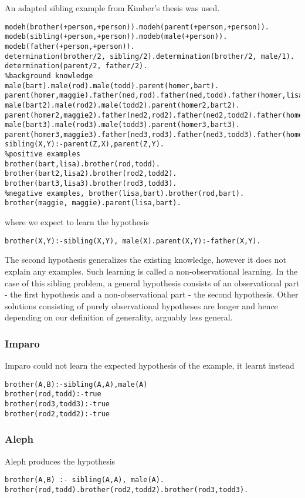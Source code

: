 An adapted sibling example from Kimber's thesis was used.
\begin{lstlisting}
modeh(brother(+person,+person)).modeh(parent(+person,+person)).
modeb(sibling(+person,+person)).modeb(male(+person)).
modeb(father(+person,+person)).
determination(brother/2, sibling/2).determination(brother/2, male/1).
determination(parent/2, father/2).
%background knowledge
male(bart).male(rod).male(todd).parent(homer,bart).
parent(homer,maggie).father(ned,rod).father(ned,todd).father(homer,lisa).
male(bart2).male(rod2).male(todd2).parent(homer2,bart2).
parent(homer2,maggie2).father(ned2,rod2).father(ned2,todd2).father(homer2,lisa2).
male(bart3).male(rod3).male(todd3).parent(homer3,bart3).
parent(homer3,maggie3).father(ned3,rod3).father(ned3,todd3).father(homer3,lisa3).
sibling(X,Y):-parent(Z,X),parent(Z,Y).
%positive examples
brother(bart,lisa).brother(rod,todd).
brother(bart2,lisa2).brother(rod2,todd2).
brother(bart3,lisa3).brother(rod3,todd3).
%negative examples, brother(lisa,bart).brother(rod,bart).
brother(maggie, maggie).parent(lisa,bart).
\end{lstlisting}
where we expect to learn the hypothesis
\begin{lstlisting}
brother(X,Y):-sibling(X,Y), male(X).parent(X,Y):-father(X,Y).
\end{lstlisting}
The second hypothesis  generalizes the existing knowledge, however it does not explain any examples. Such learning is called a non-observational learning. In the case of this sibling problem, a general hypothesis consists of an observational part - the first hypothesis and a non-observational part - the second hypothesis.
Other solutions consisting of purely observational hypotheses are longer and hence depending on our definition of generality, arguably less general.

\subsubsection{Imparo}
Imparo could not learn the expected hypothesis of the example, it learnt instead
\begin{lstlisting}
brother(A,B):-sibling(A,A),male(A)
brother(rod,todd):-true
brother(rod3,todd3):-true
brother(rod2,todd2):-true
\end{lstlisting}

\subsubsection{Aleph}
Aleph produces the hypothesis
\begin{lstlisting}
brother(A,B) :- sibling(A,A), male(A).
brother(rod,todd).brother(rod2,todd2).brother(rod3,todd3).
\end{lstlisting}

